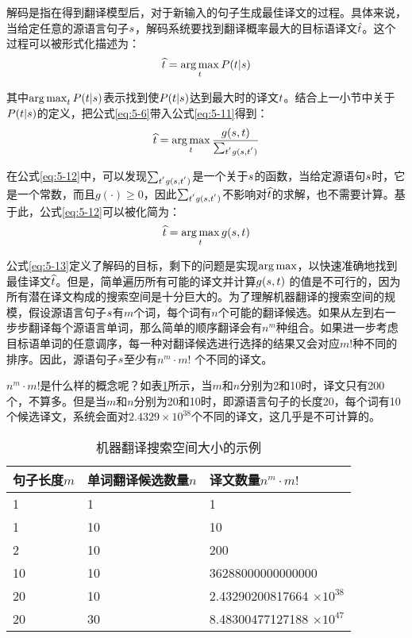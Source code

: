 \parinterval 解码是指在得到翻译模型后，对于新输入的句子生成最佳译文的过程。具体来说，当给定任意的源语言句子${s}$，解码系统要找到翻译概率最大的目标语译文$\hat{{t}}$。这个过程可以被形式化描述为：
\begin{eqnarray}
\widehat{{t}}=\operatorname*{arg\,max}_{{t}} {P}({t}|{s})
\label{eq:5-11}
\end{eqnarray}

\noindent  其中$\operatorname*{arg\,max}_{{t}} {P}({t}|{s})$表示找到使${P}({t}|{s})$达到最大时的译文${t}$。结合上一小节中关于${P}({t}|{s})$的定义，把公式\eqref{eq:5-6}带入公式\eqref{eq:5-11}得到：
\begin{eqnarray}
\widehat{{t}}=\operatorname*{arg\,max}_{{t}}\frac{g({s},{t})}{\sum_{{t}^{'}g({s},{t}^{'})}}
\label{eq:5-12}
\end{eqnarray}

\parinterval 在公式\eqref{eq:5-12}中，可以发现${\sum_{{t}^{'}g({s},{t}^{'})}}$是一个关于${s}$的函数，当给定源语句${s}$时，它是一个常数，而且$g(\cdot) \ge 0$，因此${\sum_{{t}^{'}g({s},{t}^{'})}}$不影响对$\widehat{{t}}$的求解，也不需要计算。基于此，公式\eqref{eq:5-12}可以被化简为：
\begin{eqnarray}
\widehat{{t}}=\operatorname*{arg\,max}_{{t}}g({s},{t})
\label{eq:5-13}
\end{eqnarray}

\parinterval 公式\eqref{eq:5-13}定义了解码的目标，剩下的问题是实现$\operatorname*{arg\,max}$，以快速准确地找到最佳译文$\widehat{{t}}$。但是，简单遍历所有可能的译文并计算$g({s},{t})$ 的值是不可行的，因为所有潜在译文构成的搜索空间是十分巨大的。为了理解机器翻译的搜索空间的规模，假设源语言句子${s}$有$m$个词，每个词有$n$个可能的翻译候选。如果从左到右一步步翻译每个源语言单词，那么简单的顺序翻译会有$n^m$种组合。如果进一步考虑目标语单词的任意调序，每一种对翻译候选进行选择的结果又会对应$m!$种不同的排序。因此，源语句子${s}$至少有$n^m \cdot m!$ 个不同的译文。

\parinterval $n^{m}\cdot m!$是什么样的概念呢？如表\ref{tab:5-2}所示，当$m$和$n$分别为2和10时，译文只有200个，不算多。但是当$m$和$n$分别为20和10时，即源语言句子的长度20，每个词有10个候选译文，系统会面对$2.4329 \times 10^{38}$个不同的译文，这几乎是不可计算的。

\begin{table}[htp]{
\begin{center}
\caption{机器翻译搜索空间大小的示例}
\label{tab:5-2}
\begin{tabular}{l | l | l}
句子长度$m$ & 单词翻译候选数量$n$ & 译文数量$n^m \cdot m!$ \\ \hline
1 & 1 & 1 \\
1 & 10 & 10 \\
2 & 10 & 200 \\
10 & 10 & 36288000000000000 \\
20 & 10 & 2.43290200817664 $\times 10^{38}$ \\
20 & 30 & 8.48300477127188 $\times 10^{47}$
\end{tabular}
\end{center}
}\end{table}

